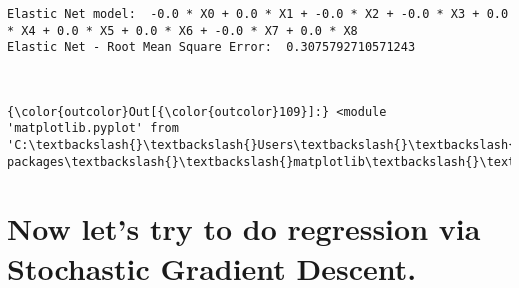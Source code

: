 \documentclass[11pt]{article}
\begin{document}
    \begin{Verbatim}[commandchars=\\\{\}]
Elastic Net model:  -0.0 * X0 + 0.0 * X1 + -0.0 * X2 + -0.0 * X3 + 0.0 * X4 + 0.0 * X5 + 0.0 * X6 + -0.0 * X7 + 0.0 * X8
Elastic Net - Root Mean Square Error:  0.3075792710571243

    \end{Verbatim}

    \begin{center}
    \end{center}
    { \hspace*{\fill} \\}
    
\begin{Verbatim}[commandchars=\\\{\}]
{\color{outcolor}Out[{\color{outcolor}109}]:} <module 'matplotlib.pyplot' from 'C:\textbackslash{}\textbackslash{}Users\textbackslash{}\textbackslash{}achow\textbackslash{}\textbackslash{}Anaconda3\textbackslash{}\textbackslash{}lib\textbackslash{}\textbackslash{}site-packages\textbackslash{}\textbackslash{}matplotlib\textbackslash{}\textbackslash{}pyplot.py'>
\end{Verbatim}
            
    \section{Now let's try to do regression via Stochastic Gradient
Descent.}\label{now-lets-try-to-do-regression-via-stochastic-gradient-descent.}
\end{document}
